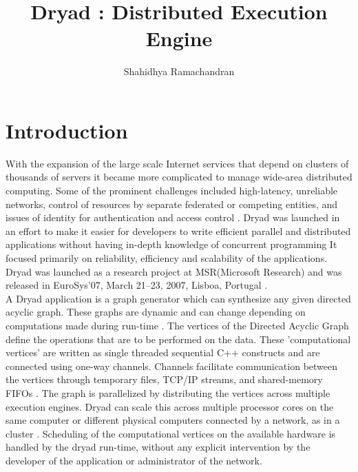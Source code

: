 \documentclass[9pt,twocolumn,twoside]{../../styles/osajnl}
\title{Dryad : Distributed Execution Engine}
\author[1]{Shahidhya Ramachandran}
\affil[1]{School of Informatics and Computing, Bloomington, IN 47408, U.S.A.}
\affil[*]{Corresponding authors: shahrama@iu.edu}
\begin{document}
\maketitle

\section{Introduction}
With the expansion of the large scale Internet services that depend on clusters of thousands of servers it became more complicated to manage wide-area distributed computing. Some of the prominent challenges included high-latency, unreliable networks, control of resources by separate federated or competing entities, and issues of identity for authentication and access control \cite{DryadMSR1}. Dryad was launched in an effort to make it easier for developers to write efficient parallel and distributed applications without having in-depth knowledge of concurrent programming \cite{www-Dryad1} It focused primarily on reliability, efficiency and scalability of the applications. Dryad was launched as a research project at MSR(Microsoft Research) and was released in EuroSys’07, March 21–23, 2007, Lisboa, Portugal \cite{DryadMSR}.\\
A Dryad application is a graph generator which can synthesize any given directed acyclic graph. These graphs are dynamic and can change depending on computations made during run-time \cite{www-Dryad1}. The vertices of the Directed Acyclic Graph define the operations that are to be performed on the data. These 'computational vertices' are written as single threaded sequential C++ constructs and are connected using one-way channels. Channels facilitate communication between the  vertices through temporary files, TCP/IP streams, and shared-memory FIFOs \cite{DryadMSR1}. The graph is parallelized by distributing the vertices across multiple execution engines. Dryad can scale this across multiple processor cores on the same computer or different physical computers connected by a network, as in a cluster \cite{DryadMSR1}. Scheduling of the computational vertices on the available hardware is handled by the dryad run-time, without any explicit intervention by the developer of the application or administrator of the network.
\end{document}
